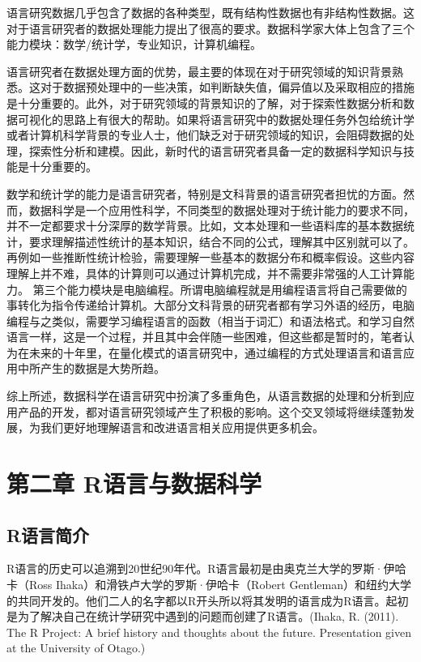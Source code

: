 \documentclass[]{book}
\begin{document}
语言研究数据几乎包含了数据的各种类型，既有结构性数据也有非结构性数据。这对于语言研究者的数据处理能力提出了很高的要求。数据科学家大体上包含了三个能力模块：数学/统计学，专业知识，计算机编程。

语言研究者在数据处理方面的优势，最主要的体现在对于研究领域的知识背景熟悉。这对于数据预处理中的一些决策，如判断缺失值，偏异值以及采取相应的措施是十分重要的。此外，对于研究领域的背景知识的了解，对于探索性数据分析和数据可视化的思路上有很大的帮助。如果将语言研究中的数据处理任务外包给统计学或者计算机科学背景的专业人士，他们缺乏对于研究领域的知识，会阻碍数据的处理，探索性分析和建模。因此，新时代的语言研究者具备一定的数据科学知识与技能是十分重要的。

数学和统计学的能力是语言研究者，特别是文科背景的语言研究者担忧的方面。然而，数据科学是一个应用性科学，不同类型的数据处理对于统计能力的要求不同，并不一定都要求十分深厚的数学背景。比如，文本处理和一些语料库的基本数据统计，要求理解描述性统计的基本知识，结合不同的公式，理解其中区别就可以了。再例如一些推断性统计检验，需要理解一些基本的数据分布和概率假设。这些内容理解上并不难，具体的计算则可以通过计算机完成，并不需要非常强的人工计算能力。
第三个能力模块是电脑编程。所谓电脑编程就是用编程语言将自己需要做的事转化为指令传递给计算机。大部分文科背景的研究者都有学习外语的经历，电脑编程与之类似，需要学习编程语言的函数（相当于词汇）和语法格式。和学习自然语言一样，这是一个过程，并且其中会伴随一些困难，但这些都是暂时的，笔者认为在未来的十年里，在量化模式的语言研究中，通过编程的方式处理语言和语言应用中所产生的数据是大势所趋。

综上所述，数据科学在语言研究中扮演了多重角色，从语言数据的处理和分析到应用产品的开发，都对语言研究领域产生了积极的影响。这个交叉领域将继续蓬勃发展，为我们更好地理解语言和改进语言相关应用提供更多机会。

\hypertarget{ux7b2cux4e8cux7ae0-rux8bedux8a00ux4e0eux6570ux636eux79d1ux5b66}{%
\chapter{第二章 R语言与数据科学}\label{ux7b2cux4e8cux7ae0-rux8bedux8a00ux4e0eux6570ux636eux79d1ux5b66}}

\hypertarget{rux8bedux8a00ux7b80ux4ecb}{%
\section{R语言简介}\label{rux8bedux8a00ux7b80ux4ecb}}

R语言的历史可以追溯到20世纪90年代。R语言最初是由奥克兰大学的罗斯·伊哈卡（Ross Ihaka）和滑铁卢大学的罗斯·伊哈卡（Robert Gentleman）和纽约大学的共同开发的。他们二人的名字都以R开头所以将其发明的语言成为R语言。起初是为了解决自己在统计学研究中遇到的问题而创建了R语言。(Ihaka, R. (2011). The R Project: A brief history and thoughts about the future. Presentation given at the University of Otago.)
\end{document}
